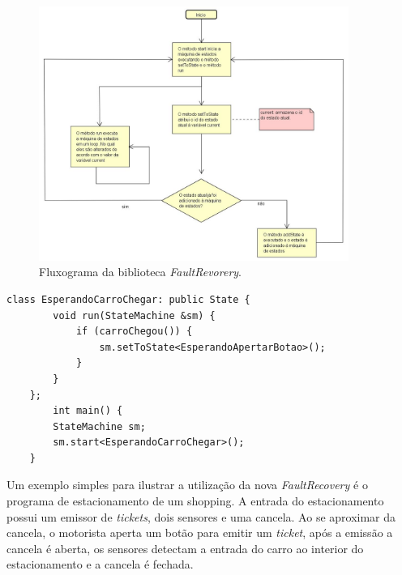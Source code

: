 \begin{figure}[H]
	\centering
	\includegraphics[width=0.9\textwidth]{figuras/fluxoFaultRecovery.jpg}
	\caption[Fluxograma da biblioteca \textit{FaultRecovery}.]{Fluxograma da biblioteca \textit{FaultRevorery}.}
	\label{Img:fluxoFaultRecovery}	
\end{figure}
\newpage
\begin{lstlisting}[label=Func:faultRecovery,caption={[Exemplo de criação de um estado]A classe EsperandoCarroChegar herda da classe \textit{State} e tem sua rotina implementada no método \textit{run}, ao encerrar a rotina o método \textit{setToState} é invocado, alterando o estado atual. No método \textit{main} um objeto \textit{StateMachine} é instanciado e o método \textit{start} é chamado, iniciando a máquina de estados. Este quadro tem como objetivo demonstrar a utilização da biblioteca, apenas um estado será posto no quadro, os demais podem ser acessados no endereço \url{https://github.com/cleitonalmeida1}.}]
	class EsperandoCarroChegar: public State {
		void run(StateMachine &sm) {
			if (carroChegou()) {
				sm.setToState<EsperandoApertarBotao>();
			}
		}
	};
		int main() {
		StateMachine sm;
		sm.start<EsperandoCarroChegar>();
	}
\end{lstlisting}

Um exemplo simples para ilustrar a utilização da nova \textit{FaultRecovery} é o programa de estacionamento de um shopping. A entrada do estacionamento possui um emissor de \textit{tickets}, dois sensores e uma cancela. Ao se aproximar da cancela, o motorista aperta um botão para emitir um \textit{ticket}, após a emissão a cancela é aberta, os sensores detectam a entrada do carro ao interior do estacionamento e a cancela é fechada.

